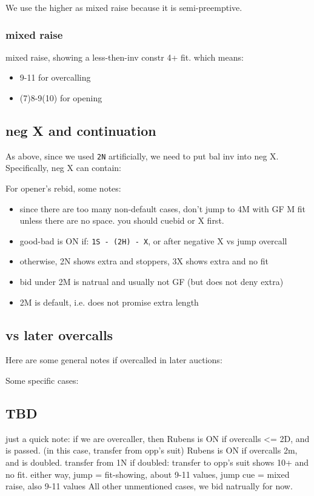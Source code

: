 We use the higher as mixed raise because it is semi-preemptive.

\subsubsection{mixed raise}

mixed raise, showing a less-then-inv constr 4+ fit. which means:
\begin{itemize}
    \setlength\itemsep{0pt}
    \item 9-11 for overcalling
    \item (7)8-9(10) for opening
\end{itemize}

\subsection{neg X and continuation}

As above, since we used \texttt{2N} artificially, we need to put bal inv into neg X. 
Specifically, neg X can contain:


For opener's rebid, some notes:

\begin{itemize}
    \setlength\itemsep{0pt}
    \item since there are too many non-default cases, don't jump to 4M with GF M fit unless there are no space. you should cuebid or X first.
    \item good-bad is ON if: \texttt{1S - (2H) - X}, or after negative X vs jump overcall
    \item otherwise, 2N shows extra and stoppers, 3X shows extra and no fit
    \item bid under 2M is natrual and usually not GF (but does not deny extra)
    \item 2M is default, i.e. does not promise extra length
\end{itemize}

\subsection{vs later overcalls}

Here are some general notes if overcalled in later auctions:


Some specific cases:


\subsection{TBD}

just a quick note: if we are overcaller, then 
Rubens is ON if overcalls <= 2D, and is passed. (in this case, transfer from opp's suit)
Rubens is ON if overcalls 2m, and is doubled.
transfer from 1N if doubled: transfer to opp's suit shows 10+ and no fit.
either way, jump = fit-showing, about 9-11 values, jump cue = mixed raise, also 9-11 values
All other unmentioned cases, we bid natrually for now.
